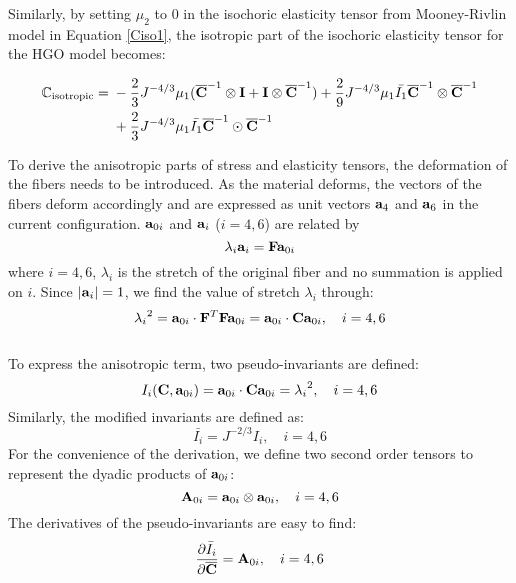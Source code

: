 Similarly, by setting $\mu_2$ to $0$ in the isochoric elasticity tensor from Mooney-Rivlin model in Equation \ref{Ciso1}, the isotropic part of the isochoric elasticity tensor for the HGO model becomes:

\begin{equation} \label{Ciso32}
\begin{split}
\mathbb{C}_\mathrm{isotropic} = {}&
- \frac{2}{3}J^{-4/3}\mu_1({\overline{\bold{C}}}^{-1} \otimes \bold{I} + \bold{I} \otimes {\overline{\bold{C}}}^{-1}) 
+
\frac{2}{9}J^{-4/3}\mu_1\bar{I_1}  {\overline{\bold{C}}}^{-1} \otimes {\overline{\bold{C}}}^{-1} \\
&+ \frac{2}{3}J^{-4/3} \mu_1\bar{I_1} {\overline{\bold{C}}}^{-1} \odot {\overline{\bold{C}}}^{-1} 
\end{split}
\end{equation}

To derive the anisotropic parts of stress and elasticity tensors, the deformation of the fibers needs to be introduced. As the material deforms, the vectors of the fibers deform accordingly and are expressed as unit vectors $\bold{a}_4$ and $\bold{a}_6$ in the current configuration. $\bold{a}_{0i}$ and $\bold{a}_{i}$ ($i = 4, 6$) are related by 
\begin{equation} \label{vector}
\lambda_i\bold{a}_i = \bold{F}\bold{a}_{0i}
\end{equation} 
where $i = 4, 6$, $\lambda_i$ is the stretch of the original fiber and no summation is applied on $i$.
Since $|\bold{a}_i| = 1$, we find the value of stretch $\lambda_i$ through:
\begin{equation}
{\lambda_i}^2 = \bold{a}_{0i} \cdot \bold{F}^T\bold{F}\bold{a}_{0i} = \bold{a}_{0i} \cdot \bold{C}\bold{a}_{0i}, \quad i = 4, 6
\end{equation}
\\
To express the anisotropic term, two pseudo-invariants are defined:
\begin{equation} \label{pseudo-invariants}
I_i(\bold{C}, \bold{a}_{0i}) = \bold{a}_{0i} \cdot \bold{C}\bold{a}_{0i} = {\lambda_i}^2, \quad i = 4, 6
\end{equation}
Similarly, the modified invariants are defined as:
\begin{equation}
\bar{I_i} = J^{-2/3}I_i, \quad i = 4, 6
\end{equation}
For the convenience of the derivation, we define two second order tensors to represent the dyadic products of $\bold{a}_{0i}$:
\begin{equation} \label{A0i}
\bold{A}_{0i} = \bold{a}_{0i} \otimes \bold{a}_{0i}, \quad i = 4, 6
\end{equation}
The derivatives of the pseudo-invariants are easy to find:
\begin{equation} \label{helper1}
\frac{\partial\bar I_i}{\partial \overline{\bold{C}}} = \bold{A}_{0i}, \quad i = 4, 6
\end{equation}


